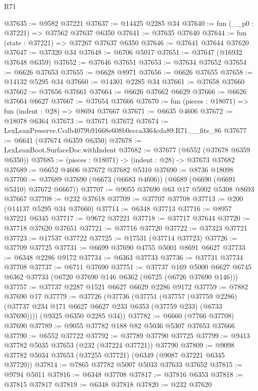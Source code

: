 \begin{lexlean}{R71}
\begin{coremodule}
@37635 := @9582 @37221
@37637 := @14425 @2285 @34
@37640 := fun (__p0 : @37221) => @37562 @37637 @6350
@37641 := @37635 @37640
@37644 := fun (state : @37221) => @37267 @37637 @6350
@37646 := @37641 @37644 @37620
@37647 := @37320 @34
@37648 := @6706 @5017
@37651 := @37647 (@16932 @37648 @6359)
@37652 := @37646 @37651
@37653 := @37634 @37652
@37654 := @6626 @37653
@37655 := @6628 @8971
@37656 := @6626 @37655
@37658 := @14132 @5295 @34
@37660 := @14301 @2285 @34
@37661 := @37658 @37660
@37662 := @37656 @37661
@37664 := @6626 @37662 @6629
@37666 := @6626 @37664 @6627
@37667 := @37654 @37666
@37670 := fun (pieces : @18071) => fun (indent : @28) => @8694 @37667
@37671 := @6635 @4606
@37672 := @18078 @6364
@37673 := @37671 @37672
@37674 := LexLeanPreserve.Ccdb4079b91668e608b0ecca3364cda89.R71.__fits_86
@37677 := @6641 (@37674 @6359 @6350)
@37678 := LexLeanBoot.SurfaceDoc.withIndent
@37682 := @37677 (@6552 (@37678 @6359 @6350))
@37685 := (pieces : @18071) -> (indent : @28) -> @37673 @37682
@37689 := @6652 @4606 @37672 @37682 @5310
@37690 := @8736 @18098
@37700 := @37689 @37690 (@6673 (@6683 @4606)) (@6689 (@6690 (@6691 @5310) @37672 @6667))
@37707 := @9055 @37690 @63 @17 @5002 @5308 @8693 @37667
@37708 := @232 @37618
@37709 := @37707 @37708
@37713 := @200 (@14137 @5295 @34 @37660)
@37714 := @6348 @37713
@37716 := @8957 @37221 @6345
@37717 := @9672 @37221
@37718 := @37717 @37644
@37720 := @37718 @37620 @37651
@37721 := @37716 @37720
@37722 := @37323 @37721
@37723 := @17537 @37722
@37725 := @17531 (@37714 @37723)
@37726 := @37709 @37725
@37731 := @6699 @37690 @4755 @5001 @8691 @6627
@37733 := @6348 @2286 @9172
@37734 := @6363 @37733
@37736 := @37731 @37734 @37708
@37737 := @6711 @37690
@37751 := @37737
    @169
    @5000
    @6627
    @6745
    @6362
    @37733
    (@6720 @37690 @146 @6362 (@6725 (@6726 @37690 @146)))
@37757 := @37737 @2287 @1521 @6627 @6629 @2286 @9172
@37759 := @7882 @37690 @17
@37779 := @37726
    (@37736
      (@37751
        (@37757
          (@37759 @2286)
          (@37737 @234 @171 @6627 @6627 @233 @6353 (@37759 @233) (@6733 @37690))))
      (@9325 @6350 @2285 @34))
@37782 := @6660 (@7766 @37708) @37690
@37789 := @9055 @37782 @188 @82 @5036 @5307 @37653 @37666
@37790 := @6552 @37722
@37792 := @37789 @37790 @37725
@37799 := @9413 @37782 @5035 @37653 (@232 (@37224 @37721)) @37790
@37809 := @9098 @37782 @5034 @37653 (@37255 @37721) (@6349 (@9087 @37221 @6345 @37720))
@37814 := @7865 @37782 @5007 @5033 @37633 @37652
@37815 := @9794 @5011
@37816 := @6348 @37708
@37817 := @37816 @6353
@37818 := @37815 @37817
@37819 := @6348 @37818
@37820 := @232 @37620

\end{coremodule}
\end{lexlean}
